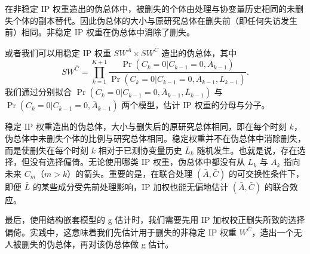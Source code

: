 在非稳定 IP 权重造出的伪总体中，被删失的个体由处理与协变量历史相同的未删失个体的副本替代。因此伪总体的大小与原研究总体在删失前（即任何失访发生前）相同。非稳定 IP 权重在伪总体中消除了删失。

或者我们可以用稳定 IP 权重 $SW^{\bar A}\times SW^{\bar C}$ 造出的伪总体，其中
\[
SW^{\bar C}=\prod_{k=1}^{K+1}\frac{\Pr(C_k=0|C_{k-1}=0,\bar A_{k-1})}{\Pr(C_k=0|C_{k-1}=0,\bar A_{k-1},\bar L_{k-1})}.
\]
我们通过分别拟合 $\Pr(C_k=0|C_{k-1}=0,\bar A_{k-1},\bar L_{k-1})$ 与 $\Pr(C_k=0|C_{k-1}=0,\bar A_{k-1})$ 两个模型，估计 IP 权重的分母与分子。


稳定 IP 权重造出的伪总体，大小与删失后的原研究总体相同，即在每个时刻 $k$，伪总体中未删失个体的比例与研究总体相同。稳定权重并不在伪总体中消除删失，而是使删失在每个时刻 $k$ 相对于已测协变量历史 $\bar L_k$ 随机发生。也就是说，存在选择，但没有选择偏倚。无论使用哪类 IP 权重，伪总体中都没有从 $L_k$ 与 $A_k$ 指向未来 $C_m$（$m>k$）的箭头。重要的是，在联合处理 $(\bar A,\bar C)$ 的可交换性条件下，即便 $\bar L$ 的某些成分受先前处理影响，IP 加权也能无偏地估计 $(\bar A,\bar C)$ 的联合效应。

最后，使用结构嵌套模型的 g 估计时，我们需要先用 IP 加权校正删失所致的选择偏倚。实践中，这意味着我们先估计用于删失的非稳定 IP 权重 $W^{\bar C}$，造出一个无人被删失的伪总体，再对该伪总体做 g 估计。

